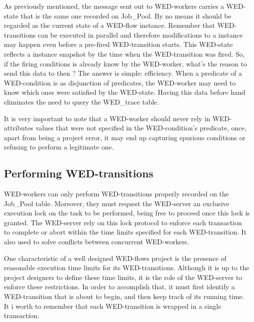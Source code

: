 \documentclass[conference]{IEEEtran}
\begin{document}
\par As previously mentioned, the message sent out to WED-workers carries a WED-state that is the same one recorded on Job\_Pool.
By no means it should be regarded as the current state of a WED-flow instance. Remember that WED-transitions can be executed
in parallel and therefore modifications to a instance may happen even before a pre-fired WED-transition starts. This WED-state
reflects a instance snapshot by the time when the WED-transition was fired. So, if the firing conditions is already know by 
the WED-worker, what's the reason to send this data to then ? The answer is simple: efficiency. When a predicate of a 
WED-condition is as disjunction of predicates, the WED-worker may need to know which ones were satisfied by the WED-state.
Having this data before hand eliminates the need to query the WED\_trace table.

\par It is very important to note that a WED-worker should never rely in WED-attributes values that were not specified in
the WED-condition's predicate, once, apart from being a project error, it may end up capturing spurious conditions or refusing
to perform a legitimate one.

\subsection{Performing WED-transitions}

WED-workers can only perform WED-transitions properly recorded on the Job\_Pool table. Moreover, they must request the WED-server
an exclusive execution lock on the task to be performed, being free to proceed once this lock is granted. The WED-server rely
on this lock protocol to enforce each transaction to complete or abort within the time limits specified for each WED-transition.
It also used to solve conflicts between concurrent WED-workers. 

\par One characteristic of a well designed WED-flows project is the presence of reasonable execution time limits for its WED-transitions.
Although it is up to the project designers to define these time limits, it is the role of the WED-server to enforce these restrictions.
In order to accomplish that, it must first identify a WED-transition that is about to begin, and then keep track of its running time.
It i worth to remember that each WED-transition is wrapped in a single transaction.
\end{document}
